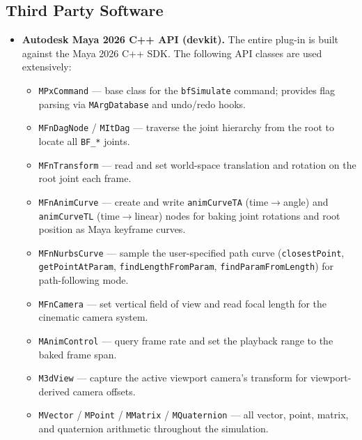\documentclass[12pt]{article}
\begin{document}
\subsection{Third Party Software}

\begin{itemize}
  \item \textbf{Autodesk Maya 2026 C++ API (devkit).} The entire plug-in is
    built against the Maya 2026 C++ SDK. The following API classes are used
    extensively:
    \begin{itemize}
      \item \texttt{MPxCommand} --- base class for the \texttt{bfSimulate}
        command; provides flag parsing via \texttt{MArgDatabase} and
        undo/redo hooks.
      \item \texttt{MFnDagNode} / \texttt{MItDag} --- traverse the joint
        hierarchy from the root to locate all \texttt{BF\_*} joints.
      \item \texttt{MFnTransform} --- read and set world-space translation
        and rotation on the root joint each frame.
      \item \texttt{MFnAnimCurve} --- create and write
        \texttt{animCurveTA} (time$\to$angle) and \texttt{animCurveTL}
        (time$\to$linear) nodes for baking joint rotations and root
        position as Maya keyframe curves.
      \item \texttt{MFnNurbsCurve} --- sample the user-specified path curve
        (\texttt{closestPoint}, \texttt{getPointAtParam},
        \texttt{findLengthFromParam}, \texttt{findParamFromLength}) for
        path-following mode.
      \item \texttt{MFnCamera} --- set vertical field of view and read
        focal length for the cinematic camera system.
      \item \texttt{MAnimControl} --- query frame rate and set the playback
        range to the baked frame span.
      \item \texttt{M3dView} --- capture the active viewport camera's
        transform for viewport-derived camera offsets.
      \item \texttt{MVector} / \texttt{MPoint} / \texttt{MMatrix} /
        \texttt{MQuaternion} --- all vector, point, matrix, and quaternion
        arithmetic throughout the simulation.
    \end{itemize}


\end{itemize}
\end{document}
